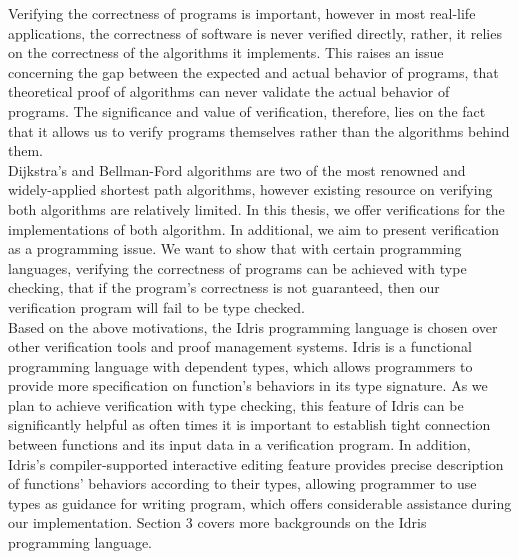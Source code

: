 Verifying the correctness of programs is important, however in most real-life applications, the correctness of software is never verified directly, rather, it relies on the correctness of the algorithms it implements. This raises an issue concerning the gap between the expected and actual behavior of programs, that theoretical proof of algorithms can never validate the actual behavior of programs. The significance and value of verification, therefore, lies on the fact that it allows us to verify programs themselves rather than the algorithms behind them. 
\\ 

Dijkstra's and Bellman-Ford algorithms are two of the most renowned and widely-applied shortest path algorithms, however existing resource on verifying both algorithms are relatively limited. In this thesis, we offer verifications for the implementations of both algorithm. In additional, we aim to present verification as a programming issue. We want to show that with certain programming languages, verifying the correctness of programs can be achieved with type checking, that if the program's correctness is not guaranteed, then our verification program will fail to be type checked.
\\

Based on the above motivations, the Idris programming language is chosen over other verification tools and proof management systems. Idris is a functional programming language with dependent types, which allows programmers to provide more specification on function's behaviors in its type signature. As we plan to achieve verification with type checking, this feature of Idris can be significantly helpful as often times it is important to establish tight connection between functions and its input data in a verification program. In addition, Idris's compiler-supported interactive editing feature provides precise description of functions' behaviors according to their types, allowing programmer to use types as guidance for writing program, which offers considerable assistance during our implementation. Section 3 covers more backgrounds on the Idris programming language. 
